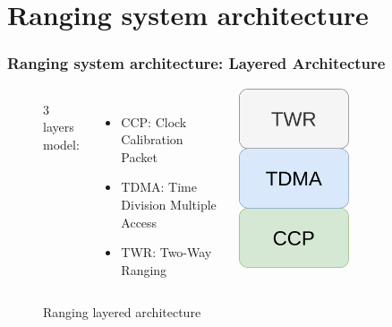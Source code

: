 \documentclass[10pt]{beamer}
\begin{document}
\section{Ranging system architecture}

\begin{frame}
    \frametitle{Ranging system architecture: Layered Architecture}
\begin{figure}[H]
    \begin{columns}
            3 layers model:
            \begin{itemize}
                \item CCP: Clock Calibration Packet
                \item TDMA: Time Division Multiple Access
                \item TWR: Two-Way Ranging
            \end{itemize}
            \begin{center}
                \includegraphics[width=0.6\textwidth]{ranging_layered_architecture}
            \end{center}
            \caption{Ranging layered architecture}
            \label{fig:ranging_layered_architecture}
    \end{columns}
\end{figure}
\end{frame}
\end{document}
